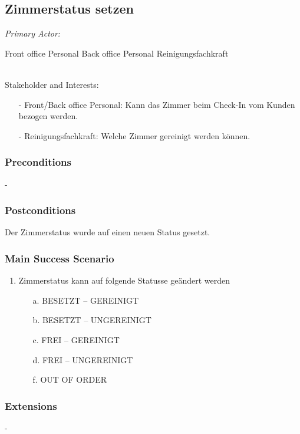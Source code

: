\documentclass[./detailed_overview_usecases.tex]{subfiles}
\begin{document}
    \subsection{Zimmerstatus setzen}
    \textit{Primary Actor:}
    \begin{enumerate}
        Front office Personal
        Back office Personal
        Reinigungsfachkraft
    \end{enumerate}
    \\
    Stakeholder and Interests:
    \begin{itemize}
        \item[-] Front/Back office Personal: Kann das Zimmer beim Check-In vom Kunden bezogen werden.
        \item[-] Reinigungsfachkraft: Welche Zimmer gereinigt werden können.
    \end{itemize}

    \subsubsection*{Preconditions}
    -
    \subsubsection*{Postconditions}
    Der Zimmerstatus wurde auf einen neuen Status gesetzt.

    \subsubsection*{Main Success Scenario}
    \begin{enumerate}
        \item Zimmerstatus kann auf folgende Statusse geändert werden
        \begin{itemize}
            \item[a.] BESETZT – GEREINIGT
            \item[b.] BESETZT – UNGEREINIGT
            \item[c.] FREI – GEREINIGT
            \item[d.] FREI – UNGEREINIGT
            \item[f.] OUT OF ORDER
        \end{itemize}
    \end{enumerate}

    \subsubsection*{Extensions}
    -
\end{document}
